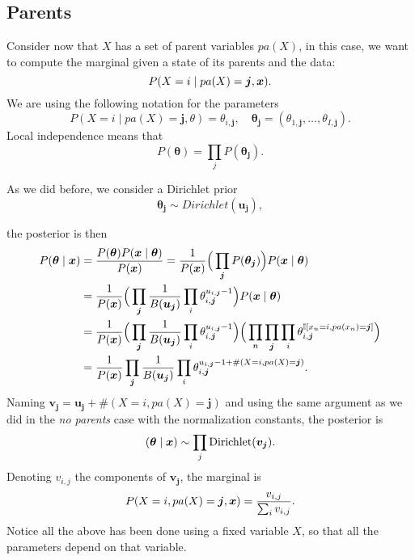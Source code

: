 \subsection{Parents}
Consider now that \(X\) has a set of parent variables \(pa(X)\), in this case,
we want to compute the marginal given a state of its parents and the data:
\[
  P(X = i \mid pa(X) = \bm{j}, \bm{x}).
\]
We are using the following notation for the parameters
\[
  P(X = i \mid pa(X) = \bm{j}, \theta) = \theta_{i,\bm{j}}, \quad \bm{\theta_{j}} = (\theta_{1,\bm{j}},\dots, \theta_{I,\bm{j}}).
\]
Local independence means that
\[
  P(\bm{\theta}) = \prod_{j}P(\bm{\theta_{j}}).
\]

As we did before, we consider a Dirichlet prior
\[
  \bm{\theta_{j}} \sim Dirichlet(\bm{u_{j}}),
\]

the posterior is then
\[
  \begin{aligned}
    P(\bm{\theta} \mid \bm{x}) &= \frac{P(\bm{\theta})P(\bm{x} \mid \bm{\theta}) }{P(\bm{x})} = \frac{1}{P(\bm{x})}\Big(\prod_{\bm{j}}P(\bm{\theta_{j}}) \Big)P(\bm{x} \mid \bm{\theta}) \\
    &= \frac{1}{P(\bm{x})}\Big(\prod_{\bm{j}}\frac{1}{B(\bm{u_{j}})}\prod_{i}\theta_{i,\bm{j}}^{u_{i,\bm{j}}-1}\Big) P(\bm{x} \mid \bm{\theta})\\
    &= \frac{1}{P(\bm{x})}\Big(\prod_{\bm{j}}\frac{1}{B(\bm{u_{j}})}\prod_{i}\theta_{i,\bm{j}}^{u_{i,\bm{j}}-1}\Big) \Big(\prod_{n}\prod_{\bm{j}}\prod_{i} \theta_{i,\bm{j}}^{\mathbb{I}[x_{n} = i, pa(x_{n}) = \bm{j}]}\Big)\\
    &= \frac{1}{P(\bm{x})}\prod_{\bm{j}}\frac{1}{B(\bm{u_{j}})}\prod_{i}\theta_{i,\bm{j}}^{u_{i,\bm{j}}-1 + \#(X = i,pa(X)=\bm{j})}.
  \end{aligned}
\]
Naming \(\bm{v_{j}} = \bm{u_{j}} + \#(X = i, pa(X) = \bm{j})\) and using the same argument as we did in the \emph{no parents} case with the normalization constants, the posterior is
\[
  (\bm{\theta} \mid \bm{x}) \sim \prod_{j}\text{Dirichlet}(\bm{v_{j}}).
\]
Denoting \(v_{i,j}\) the components of \(\bm{v_{j}}\), the marginal is
\[
  P(X=i, pa(X) = \bm{j}, \bm{x}) = \frac{v_{i,j}}{\sum_{i}v_{i,j}}.
\]
Notice all the above has been done using a fixed variable \(X\), so that all the parameters depend on that variable.
